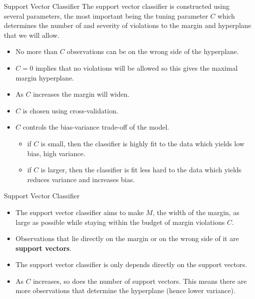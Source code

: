\documentclass[
  ignorenonframetext,
  aspectratio=169,
]{beamer}
\providecommand{\tightlist}{%
  \setlength{\itemsep}{0pt}\setlength{\parskip}{0pt}}\usepackage{longtable,booktabs,array}
\begin{document}
\begin{frame}{Support Vector Classifier}
\protect\hypertarget{support-vector-classifier-2}{}
The support vector classifier is constructed using several parameters,
the most important being the tuning parameter \(C\) which
\alert{determines the number of and severity of violations to the margin and hyperplane}
that we will allow.

\begin{itemize}
\item
  No more than \(C\) observations can be on the wrong side of the
  hyperplane.
\item
  \(C = 0\) implies that no violations will be allowed so this gives the
  maximal margin hyperplane.
\item
  As \(C\) increases the margin will widen.
\item
  \(C\) is chosen using cross-validation.
\item
  \(C\) controls the bias-variance trade-off of the model.

  \begin{itemize}
  \tightlist
  \item
    if \(C\) is small, then the classifier is highly fit to the data
    which yields low bias, high variance.
  \item
    if \(C\) is larger, then the classifier is fit less hard to the data
    which yields reduces variance and increases bias.
  \end{itemize}
\end{itemize}
\end{frame}

\begin{frame}{Support Vector Classifier}
\protect\hypertarget{support-vector-classifier-3}{}
\begin{itemize}
\item
  The support vector classifier
  \alert{aims to make $M$, the width of the margin, as large as possible while staying within the budget of margin violations $C$}.
\item
  Observations that lie directly on the margin or on the wrong side of
  it are \textbf{support vectors}.
\item
  The support vector classifier is
  \alert{only depends directly on the support vectors}.
\item
  As \(C\) increases, so does the number of support vectors. This means
  there are more observations that determine the hyperplane (hence lower
  variance).
\end{itemize}
\end{frame}
\end{document}
